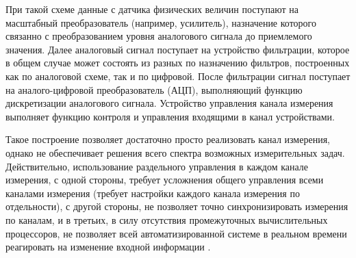 \documentclass[a4paper, 14pt, titlepage]{extarticle}
\newenvironment{myfigure}[2]%
    {\pushQED{\caption{#1} \label{#2}} %
     \begin{figure}[!htb]\centering } %
    {  \popQED %
     \end{figure}}
\begin{document}
  \begin{myfigure}{Функциональная схема канала измерения}{fig:channel-scheme}
  \end{myfigure}

  При такой схеме данные с датчика физических величин поступают на масштабный преобразователь (например, усилитель),
  назначение которого связанно с преобразованием уровня аналогового сигнала до приемлемого значения.
  Далее аналоговый сигнал поступает на устройство фильтрации, которое в общем случае может состоять
  из разных по назначению фильтров, построенных как по аналоговой схеме, так и по цифровой. После
  фильтрации сигнал поступает на аналого-цифровой преобразователь (АЦП), выполняющий
  функцию дискретизации аналогового сигнала. Устройство управления канала измерения
  выполняет функцию контроля и управления входящими в канал устройствами.

  Такое построение позволяет
  достаточно просто реализовать канал измерения, однако не обеспечивает решения всего спектра
  возможных измерительных задач. Действительно, использование раздельного управления в каждом канале
  измерения, с одной стороны, требует усложнения общего управления всеми каналами измерения (требует
  настройки каждого канала измерения по отдельности), с другой стороны, не позволяет точно
  синхронизировать измерения по каналам, и в третьих, в силу отсутствия промежуточных вычислительных
  процессоров, не позволяет всей автоматизированной системе в реальном времени реагировать на
  изменение входной информации \cite{stupin-methods}.
\end{document}
